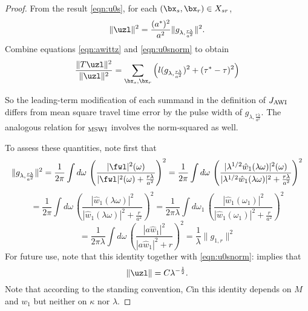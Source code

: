 \begin{proof}
From the result \ref{eqn:u0s}, for each
$(\bx_s,\bx_r) \in X_{sr}$,
\begin{equation}
  \label{eqn:u0snorm}
  \|\uzl\|^2=
  \frac{(a^*)^2}{a^2}\|g_{\lambda,\frac{r\lambda}{a^2}}\|^2.
\end{equation}
Combine equations \ref{eqn:awittz} and \ref{eqn:u0snorm} to obtain
\begin{equation}
  \label{eqn:AWIasym2}
  \frac{\|T\uzl\|^2}{\|\uzl\|^2}= \sum_{\bx_s,\bx_r} \left(l(g_{\lambda,\frac{r\lambda}{a^2}})^2  + (\tau^*-\tau)^2\right)
 \end{equation}

So the leading-term modification of each summand in the definition of $J_{\rm AWI}$ differs from mean square
travel time error by the pulse width of
$g_{\lambda,\frac{r\lambda}{a^2}}$. The analogous relation for $_{\rm
  MSWI}$ involves the norm-squared as well.


To assess these
quantities, note first that
\[
  \|g_{\lambda,\frac{r\lambda}{a^2}}\|^2 =\frac{1}{2\pi} \int d\omega\,
  \left(\frac{|\fwl|^2(\omega)}{|\fwl|^2(\omega) + \frac{r\lambda}{a^2}}\right)^2
=\frac{1}{2\pi} \int d\omega\,
  \left(\frac{|\lambda^{1/2}\hat{w}_1(\lambda
      \omega)|^2(\omega)}{|\lambda^{1/2}\hat{w}_1(\lambda
      \omega)|^2 + \frac{r\lambda}{a^2}}\right)^2
\]
\[
=\frac{1}{2\pi}\int d\omega\,
  \left(\frac{|\hat{w}_1(\lambda
      \omega)|^2}{|\hat{w}_1(\lambda
      \omega)|^2 + \frac{r}{a^2}}\right)^2
=  \frac{1}{2\pi \lambda} \int d\omega_1\,
  \left(\frac{|\hat{w}_1(\omega_1)|^2}{|\hat{w}_1(\omega_1)|^2 +
      \frac{r}{a^2}}\right)^2 
\]
\begin{equation}
  \label{eqn:g0}
  = \frac{1}{2\pi \lambda} \int d\omega\,
  \left(\frac{|a\hat{w}_1|^2}{|a\hat{w}_1|^2 + r}\right)^2 =
  \frac{1}{\lambda} \|g_{1,r}\|^2
\end{equation}
For future use, note that this identity together with \ref{eqn:u0snorm}: implies that
\begin{equation}
    \label{eqn:u0snormlam}
  \|\uzl\| = C\lambda^{-\frac{1}{2}}.
\end{equation}
Note that according to the standing convention, $C$in this identity
depends on $M$ and $w_1$ but neither on $\kappa$ nor $\lambda$.


\end{proof}
